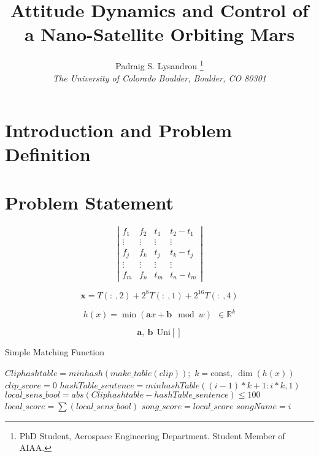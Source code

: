 \documentclass[paper]{aiaaNew}
\title{Attitude Dynamics and Control of a Nano-Satellite Orbiting Mars}
\author{Padraig S. Lysandrou
  \thanks{PhD Student, Aerospace Engineering Department.  Student Member of AIAA.}
  \\
  \emph{\normalsize The University of Colorado Boulder, Boulder, CO 80301}
}
\begin{document}
\maketitle

\section*{Introduction and Problem Definition}


\section*{Problem Statement}


\begin{equation}
\left| \begin{array}{c|c|c|c}{f_{1}} & {f_{2}} & {t_{1}} & {t_{2}-t_{1}} \\ {\vdots} & {\vdots} & {\vdots} & {\vdots} \\ {f_{j}} & {f_{k}} & {t_{j}} & {t_{k}-t_{j}} \\ {\vdots} & {\vdots} & {\vdots} & {\vdots} \\ {f_{m}} & {f_{n}} & {t_{m}} & {t_{n}-t_{m}}\end{array}\right|
\end{equation}



\begin{equation}
  \bm{x} = T(:\ ,2) + 2^8T(:\ ,1) + 2^{16}T(:\ ,4) 
\end{equation}

\begin{equation}
  h(x) = \min{(\bm{a}x + \bm{b} \mod w)} \ \ \in \mathbb{R}^k
\end{equation}

\begin{equation}
  \bm{a},\ \bm{b} \ \  \text{Uni}[]
\end{equation}



\begin{algorithm}
\caption{Simple Matching Function}\label{match}
\begin{algorithmic}[1]
\State $Cliphashtable = minhash(make\_table(clip));$
\State $k = \text{const}, \ \dim(h(x))$
\State $clip\_score = 0$
    \State $ hashTable\_sentence = minhashTable((i-1)*k+1: i*k,1)$
    \State $ local\_sens\_bool = abs(Cliphashtable-hashTable\_sentence) \leq 100$
    \State $ local\_score = \sum(local\_sens\_bool)$
        \State $song\_score = local\_score$
        \State $songName = i$
    \EndIf
\EndFor
\end{algorithmic}
\end{algorithm}
\end{document}
